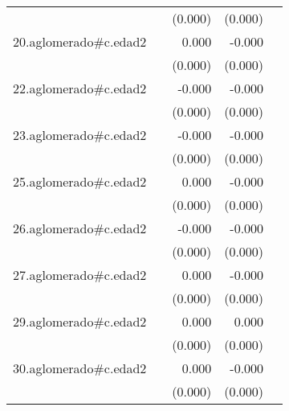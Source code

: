 {\begin{longtable}{l*{4}{D{.}{.}{-1}}}
            &                     &     (0.000)         &     (0.000)         &                     \\
\addlinespace
20.aglomerado#c.edad2&                     &       0.000         &      -0.000         &                     \\
            &                     &     (0.000)         &     (0.000)         &                     \\
\addlinespace
22.aglomerado#c.edad2&                     &      -0.000         &      -0.000         &                     \\
            &                     &     (0.000)         &     (0.000)         &                     \\
\addlinespace
23.aglomerado#c.edad2&                     &      -0.000         &      -0.000         &                     \\
            &                     &     (0.000)         &     (0.000)         &                     \\
\addlinespace
25.aglomerado#c.edad2&                     &       0.000         &      -0.000         &                     \\
            &                     &     (0.000)         &     (0.000)         &                     \\
\addlinespace
26.aglomerado#c.edad2&                     &      -0.000         &      -0.000         &                     \\
            &                     &     (0.000)         &     (0.000)         &                     \\
\addlinespace
27.aglomerado#c.edad2&                     &       0.000         &      -0.000         &                     \\
            &                     &     (0.000)         &     (0.000)         &                     \\
\addlinespace
29.aglomerado#c.edad2&                     &       0.000\sym{**} &       0.000         &                     \\
            &                     &     (0.000)         &     (0.000)         &                     \\
\addlinespace
30.aglomerado#c.edad2&                     &       0.000         &      -0.000         &                     \\
            &                     &     (0.000)         &     (0.000)         &                     \\

\end{longtable}}
